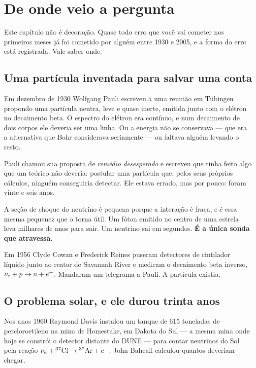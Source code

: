 \chapter{De onde veio a pergunta}

Este capítulo não é decoração. Quase todo erro que você vai cometer nos
primeiros meses já foi cometido por alguém entre 1930 e 2005, e a forma do erro
está registrada. Vale saber onde.

\section{Uma partícula inventada para salvar uma conta}

Em dezembro de 1930 Wolfgang Pauli escreveu a uma reunião em Tübingen propondo
uma partícula neutra, leve e quase inerte, emitida junto com o elétron no
decaimento beta. O espectro do elétron era contínuo, e num decaimento de dois
corpos ele deveria ser uma linha. Ou a energia não se conservava --- que era a
alternativa que Bohr considerava seriamente --- ou faltava alguém levando o
resto.

Pauli chamou sua proposta de \emph{remédio desesperado} e escreveu que tinha
feito algo que um teórico não deveria: postular uma partícula que, pelos seus
próprios cálculos, ninguém conseguiria detectar. Ele estava errado, mas por
pouco: foram vinte e seis anos.

\begin{nota}
A seção de choque do neutrino é pequena porque a interação é fraca, e é essa
mesma pequenez que o torna útil. Um fóton emitido no centro de uma estrela leva
milhares de anos para sair. Um neutrino sai em segundos. \textbf{É a única
sonda que atravessa.}
\end{nota}

Em 1956 Clyde Cowan e Frederick Reines puseram detectores de cintilador líquido
junto ao reator de Savannah River e mediram o decaimento beta inverso,
$\bar{\nu_e} + p \to n + e^+$. Mandaram um telegrama a Pauli. A partícula existia.

\section{O problema solar, e ele durou trinta anos}

Nos anos 1960 Raymond Davis instalou um tanque de 615 toneladas de
percloroetileno na mina de Homestake, em Dakota do Sul --- a mesma mina onde
hoje se constrói o detector distante do DUNE --- para contar neutrinos do Sol
pela reação $\nu_e + {}^{37}\text{Cl} \to {}^{37}\text{Ar} + e^-$. John Bahcall
calculou quantos deveriam chegar.

